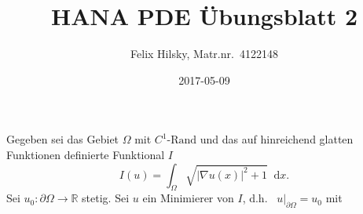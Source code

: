 \documentclass{scrartcl}
\author{Felix Hilsky, Matr.nr.\ 4122148}
\title{HANA PDE Übungsblatt 2}
\date{2017-05-09}
\newcommand{\abs}[1]{\left\lvert #1 \right\rvert}
\newcommand{\restr}[2]{\left. #1 \right|_{#2}}
\newcommand{\intd}{\mathop{} \mathrm{d}}
\newcommand{\Rand}[1]{\partial #1}
\newcommand{\reals}{\mathbb{R}}
\begin{document}
  \maketitle


  Gegeben sei das Gebiet
  $\Omega$ mit
  $C^1\text{-Rand}$ und das auf hinreichend glatten Funktionen definierte Funktional $I$
  \begin{equation}
    I(u) = \int_{\Omega}
    \sqrt
    { \abs{ \nabla u (x) } ^ 2 + 1}
    \intd x.
  \end{equation}
  Sei $u_0 \colon \Rand{\Omega} \to
  \reals$ stetig.
  Sei $u$ ein Minimierer von $I$, d.h.\ 
  $\restr{u}{\Rand {\Omega}} = u_0$ mit
\end{document}
